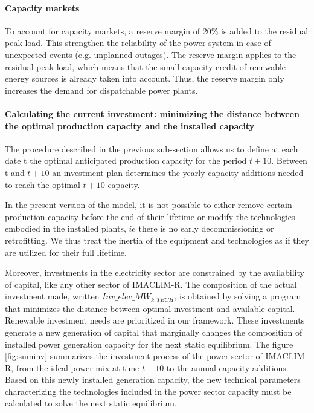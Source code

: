  \paragraph{Capacity markets}
 
To account for capacity markets, a reserve margin of 20\% is added to the residual peak load. This strengthen the reliability of the power system in case of unexpected events (e.g. unplanned outages). The reserve margin applies to the residual peak load, which means that the small capacity credit of renewable energy sources is already taken into account. Thus, the reserve margin only increases the demand for dispatchable power plants.

\paragraph{Calculating the current investment: minimizing the distance between the optimal production capacity and the installed capacity}

The procedure described in the previous sub-section allows us to define at each date t the optimal anticipated production capacity for the period $t+10$. Between t and $t+10$ an investment plan determines the yearly capacity additions needed to reach the optimal $t+10$ capacity.

In the present version of the model, it is not possible to either remove certain production capacity before the end of their lifetime or modify the technologies embodied in the installed plants, $ie$ there is no early decommissioning or retrofitting. We thus treat the inertia of the equipment and technologies as if they are utilized for their full lifetime.

Moreover, investments in the electricity sector are constrained by the availability of capital, like any other sector of IMACLIM-R. The composition of the actual investment made, written $Inv\_elec\_MW_{k,TECH}$, is obtained by solving a program that minimizes the distance between optimal investment and available capital. Renewable investment needs are prioritized in our framework.
These investments generate a new generation of capital that marginally changes the composition of installed power generation capacity for the next static equilibrium. The figure \ref{fig:suminv} summarizes the investment process of the power sector of IMACLIM-R, from the ideal power mix at time $t+10$ to the annual capacity additions.
Based on this newly installed generation capacity, the new technical parameters characterizing the technologies included in the power sector capacity must be calculated to solve the next static equilibrium.

